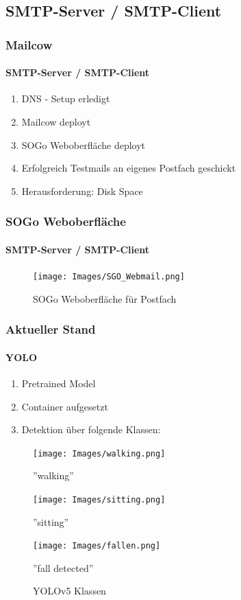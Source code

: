 \documentclass[]{beamer}
\begin{document}
\subsection{SMTP-Server / SMTP-Client}
\begin{frame}
	\frametitle{Mailcow}
	\framesubtitle{SMTP-Server / SMTP-Client}
	\begin{enumerate}
		\item DNS - Setup erledigt
		\item Mailcow deployt
		\item SOGo Weboberfläche deployt
		\item Erfolgreich Testmails an eigenes Postfach geschickt
		\item Herausforderung: Disk Space
	\end{enumerate}
\end{frame}

\begin{frame}
	\frametitle{SOGo Weboberfläche}
	\framesubtitle{SMTP-Server / SMTP-Client}
	\begin{figure}
		\begin{minipage}[t]{1\textwidth}
			\centering
			\texttt{[image: Images/SGO\_Webmail.png]}
		\end{minipage}
		\caption{SOGo Weboberfläche für Postfach}
	\end{figure}
\end{frame}

\begin{frame}
	\frametitle{Aktueller Stand}
	\framesubtitle{YOLO}
	
		\begin{enumerate}
		\item Pretrained Model
		\item Container aufgesetzt
		\item Detektion über folgende Klassen:
	\end{enumerate}
	
	\begin{figure}
		\centering
		\begin{minipage}[t]{0.3\textwidth}
			\centering
			\texttt{[image: Images/walking.png]}
			\caption*{''walking''}
		\end{minipage}
		\hfill
		\begin{minipage}[t]{0.3\textwidth}
			\centering
			\texttt{[image: Images/sitting.png]}
			\caption*{''sitting''}
		\end{minipage}
		\hfill
		\begin{minipage}[t]{0.3\textwidth}
			\centering
			\texttt{[image: Images/fallen.png]}
			\caption*{ ''fall detected''}
		\end{minipage}
		\caption{YOLOv5 Klassen}
		\label{fig:yolo_classes}
	\end{figure}

\end{frame}
\end{document}
